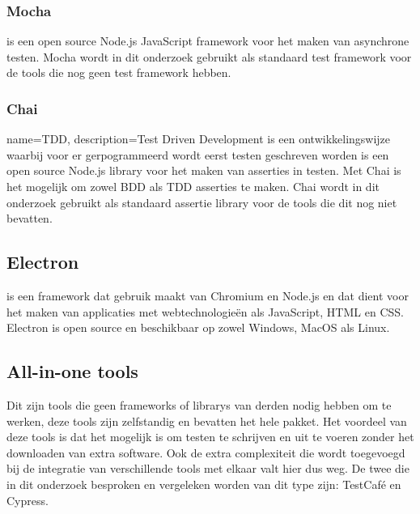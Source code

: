 \subsubsection{Mocha}
\textcite{Mocha} is een open source Node.js JavaScript \gls{framework} voor het maken van asynchrone testen. Mocha wordt in dit onderzoek gebruikt als standaard test \gls{framework} voor de \glspl{tool} die nog geen test \gls{framework} hebben.

\subsubsection{Chai}
{
    name={TDD},
    description={Test Driven Development is een ontwikkelingswijze waarbij voor er gerpogrammeerd wordt eerst testen geschreven worden}
}
\textcite{Chai} is een open source Node.js \gls{library} voor het maken van \glspl{assertie} in testen. Met Chai is het mogelijk om zowel \gls{BDD} als \gls{TDD} \glspl{assertie} te maken. Chai wordt in dit onderzoek gebruikt als standaard \gls{assertie} \gls{library} voor de \glspl{tool} die dit nog niet bevatten.

\subsection{Electron}
\textcite{Electron} is een \gls{framework} dat gebruik maakt van Chromium en Node.js en dat dient voor het maken van applicaties met webtechnologieën als JavaScript, \gls{HTML} en \gls{CSS}. Electron is open source en beschikbaar op zowel Windows, MacOS als Linux.

\subsection{All-in-one tools}

Dit zijn \glspl{tool} die geen \glspl{framework} of \glspl{library} van derden nodig hebben om te werken, deze \glspl{tool} zijn zelfstandig en bevatten het hele pakket. Het voordeel van deze \glspl{tool} is dat het mogelijk is om testen te schrijven en uit te voeren zonder het downloaden van extra software. Ook de extra complexiteit die wordt toegevoegd bij de integratie van verschillende \glspl{tool} met elkaar valt hier dus weg. De twee die in dit onderzoek besproken en vergeleken worden van dit type zijn: TestCafé en Cypress.


